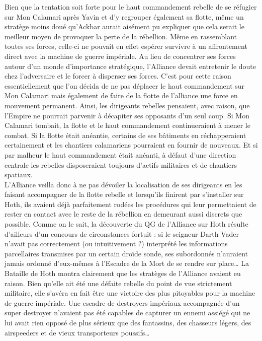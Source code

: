 \documentclass[twoside]{article}
\begin{document}
Bien que la tentation soit forte pour le haut commandement rebelle de se réfugier sur Mon Calamari après Yavin et d'y regrouper également sa flotte, même un stratège moins doué qu'Ackbar aurait aisément pu expliquer que cela serait le meilleur moyen de provoquer la perte de la rébellion. Même en rassemblant toutes ses forces, celle-ci ne pouvait en effet espérer survivre à un affrontement direct avec la machine de guerre impériale. Au lieu de concentrer ses forces autour d'un monde d'importance stratégique, l'Alliance devait entretenir le doute chez l'adversaire et le forcer à disperser ses forces. C'est pour cette raison essentiellement que l'on décida de ne pas déplacer le haut commandement sur Mon Calamari mais également de faire de la flotte de l'alliance une force en mouvement permanent. Ainsi, les dirigeants rebelles pensaient, avec raison, que l'Empire ne pourrait parvenir à décapiter ses opposants d'un seul coup. Si Mon Calamari tombait, la flotte et le haut commandement continueraient à mener le combat. Si la flotte était anéantie, certains de ses bâtiments en réchapperaient certainement et les chantiers calamariens pourraient en fournir de nouveaux. Et si par malheur le haut commandement était anéanti, à défaut d'une direction centrale les rebelles disposeraient toujours d'actifs militaires et de chantiers spatiaux.\\

L'Alliance veilla donc à ne pas dévoiler la localisation de ses dirigeants en les faisant accompagner de la flotte rebelle et lorsqu'ils finirent par s'installer sur Hoth, ils avaient déjà parfaitement rodées les procédures qui leur permettaient de rester en contact avec le reste de la rébellion en demeurant aussi discrets que possible. Comme on le sait, la découverte du QG de l'Alliance sur Hoth résulte d'ailleurs d'un concours de circonstances fortuit : si le seigneur Darth Vader n'avait pas correctement (ou intuitivement ?) interprété les informations parcellaires transmises par un certain droïde sonde, ses subordonnés n'auraient jamais ordonné d'eux-mêmes à l'Escadre de la Mort de se rendre sur place\ldots
La Bataille de Hoth montra clairement que les stratèges de l'Alliance avaient eu raison. Bien qu'elle ait été une défaite rebelle du point de vue strictement militaire, elle s'avéra en fait être une victoire des plus pitoyables pour la machine de guerre impériale. Une escadre de destroyers impériaux accompagnée d'un super destroyer n'avaient pas été capables de capturer un ennemi assiégé qui ne lui avait rien opposé de plus sérieux que des fantassins, des chasseurs légers, des airspeeders et de vieux transporteurs poussifs\ldots\\
\end{document}
